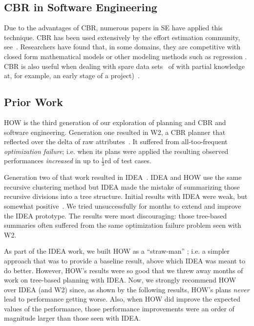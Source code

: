 \documentclass[conference]{IEEEtran}
\begin{document}
\subsection{CBR in Software Engineering}
Due to the advantages of CBR, numerous papers in SE
have applied this technique.    CBR  has been used extensively by the effort estimation community, see~\cite{keung2008analogy, 6600685, walkerden1999empirical, shepperd1997estimating, kocaguneli2010use}. 
Researchers have found that, in some domains, they are competitive with  closed form mathematical models or other modeling methods such as regression \cite{keung2008analogy}. 
CBR is also useful when dealing with spare data sets~\cite{1438374} of with 
partial knowledge  at, for example,  an early stage of a project)~\cite{walkerden1999empirical}. 

\subsection{Prior Work}

HOW is the third
generation of our exploration of  planning and CBR and software engineering.
Generation one  resulted in
 W2, a CBR planner that reflected over the delta of raw  attributes~\cite{6600685}. It suffered from all-too-frequent {\em optimization failure}; i.e. when its plans were applied the resulting observed
performances {\em increased} in up to $\frac{1}{3}$rd of test cases.

Generation two of that work resulted in  IDEA~\cite{me12c}.
IDEA and HOW use the    same recursive clustering
method but IDEA made the mistake of  summarizing those
recursive divisions into a tree structure. Initial results with IDEA were weak, but somewhat
positive~\cite{me12c}. We tried unsuccessfully for  months to extend and improve
the IDEA prototype. The results were most discouraging: those tree-based summaries often suffered
from the same optimization failure problem seen with W2. 

As part of the IDEA work, we built HOW as a ``straw-man'' ; i.e. a  simpler
approach that was  to provide a baseline result,  above which IDEA was meant
to do better.   However, HOW's results were so good that we  threw away months
of work on tree-based planning with IDEA. Now, we strongly recommend HOW
over IDEA (and W2) since, as shown by the following results, HOW's plans {\em never} lead to performance getting worse. Also, when HOW did improve the expected values of the performance,
those performance improvements were an order of magnitude larger than those seen
with IDEA.
\end{document}
